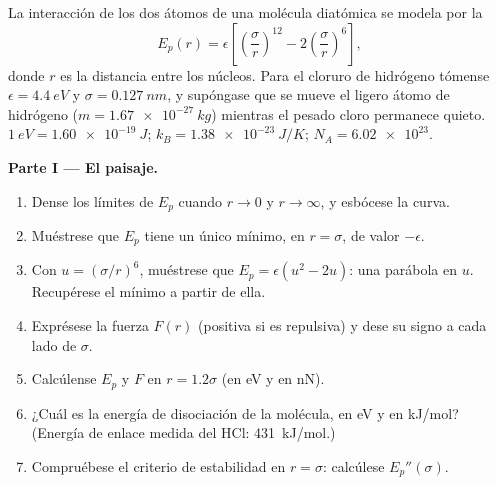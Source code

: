 \begin{problem}
\label{pb:b1:work-and-energy:1}
La interacción de los dos átomos de una molécula diatómica se modela por
la 
\[
E_p(r) = \epsilon\left[\left(\frac{\sigma}{r}\right)^{12} - 2\left(\frac{\sigma}{r}\right)^{6}\right],
\]
donde $r$ es la distancia entre los núcleos. Para el cloruro de hidrógeno
tómense $\epsilon = \qty{4.4}{eV}$ y $\sigma = \qty{0.127}{nm}$, y
supóngase que se mueve el ligero átomo de hidrógeno
($m = \qty{1.67e-27}{kg}$) mientras el pesado cloro permanece quieto.
$\qty{1}{eV} = \qty{1.60e-19}{J}$; $k_B = \qty{1.38e-23}{J/K}$;
$N_A = \num{6.02e23}$.

\medskip
\noindent\textbf{Parte I --- El paisaje.}
\begin{enumerate}
  \item Dense los límites de $E_p$ cuando $r \to 0$ y $r \to \infty$, y
        esbócese la curva.
  \item Muéstrese que $E_p$ tiene un único mínimo, en $r = \sigma$, de
        valor $-\epsilon$.
  \item Con $u = (\sigma/r)^6$, muéstrese que $E_p = \epsilon(u^2 - 2u)$:
        una parábola en $u$. Recupérese el mínimo a partir de ella.
  \item Exprésese la fuerza $F(r)$ (positiva si es repulsiva) y dese su
        signo a cada lado de $\sigma$.
  \item Calcúlense $E_p$ y $F$ en $r = 1.2\sigma$ (en eV y en nN).
  \item ¿Cuál es la energía de disociación de la molécula, en eV y en
        \unit{kJ/mol}? (Energía de enlace medida del HCl: \qty{431}{kJ/mol}.)
  \item Compruébese el criterio de estabilidad en $r = \sigma$: calcúlese
        $E_p''(\sigma)$.
\end{enumerate}


\end{problem}
